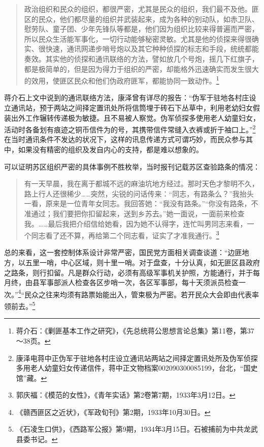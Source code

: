 \begin{quote}

政治组织和民众的组织，都很严密，尤其是民众的组织，我们最不及他。匪区的民众，他们都尽量的组织并武装起来，成为各种的别动队，如赤卫队、慰劳队、童子团、少年先锋队等都是，他们因为组织比较来得普遍而严密，所以民众生活能军事化，一切行动能够秘密灵敏。尤其是他的侦探来得很确实、很快速，通讯网递步哨号炮以及其它种种侦探的标志和手段，统统都能奏效。其实他的侦探和通讯联络的方法，譬如放几个号炮，摇几下红旗子，都是极简单的，但是因为得力于组织的严密，却能格外迅速确实而发生很大的效用，使匪区民众和他们伪政府匪军，都能协同一致动作。\footnote{蒋介石：《剿匪基本工作之研究》，《先总统蒋公思想言论总集》第11卷，第37～38页。}
\end{quote}


蒋介石上文中说到的通讯联络方法，康泽曾有详尽的报告：“伪军于驻地各村庄设立通讯站，预于两站之间择定置讯处所将信筒埋于砖石下丛草中，利用老幼妇女假装出外工作辗转传递极为敏捷。且不易被人察觉。伪军侦探多使用老人幼童妇女，活动时各备划有痕迹之铜币信件为的号，其携带信件常缝入衣裤或折于袖口上。”\footnote{康泽电蒋中正伪军于驻地各村庄设立通讯站两站之间择定置讯处所及伪军侦探多用老人幼童妇女传递信件，蒋中正文物档案002090300085199，台北，“国史馆”藏。}在当时通讯条件不发达的状况下，这样的讯息传递方式可谓巧妙，而民众参与其中，如果没有精密的组织及发自内心的支持，都是难以想象的。


可以证明苏区组织严密的具体事例不胜枚举，当时报刊记载苏区查验路条的情况：

\begin{quote}

有一天早晨，我在离于都城不远的麻油坑地方经过。那时天色才黎明不久，路上行人还很稀少……突然，尖锐的问话传来：“同志，有路条么？”我抬头一看，原来是一位青年女同志。我回答她：“我没有路条。”“你没有路条，不准通过；我们要把你扣留起来，送到乡苏去。”她一面说，一面前来检查我。……最后我把介绍信给她看，因为她不认得字，连忙叫男同志来看，一个同志看了还不算，再给第二个同志看，证实了才准我通行。\footnote{郭庆福：《模范的女性》，《青年实话》第2卷第7期，1933年3月12日。}
\end{quote}


总的来看，这一套控制体系设计非常严密，国民党方面相关调查谈道：“边匪地方，以五里一哨，中心区域，则十里一哨。对于盘查，十分认真，如无匪区县政府之路条，则行扣留。凡是群众行动，必须有高级军事机关护照，方能通行，并于每月终，由县军事部派人检查各区步哨一次，各区军事部，每十天须派员检查一次。”\footnote{《赣西匪区之近状》，《军政旬刊》第2期，1933年10月30日。}“民众之往来均须有路票始能出入，管束极为严密。若开民众大会即由代表率领前去。”\footnote{《石凌生口供》，《西路军公报》第9期，1934年3月15日。石被捕前为中共龙武县委书记。}


